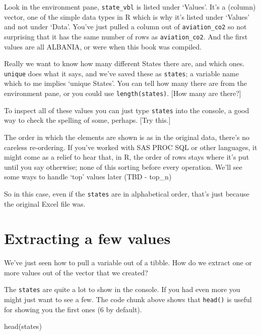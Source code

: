 \documentclass[
]{book}
\newenvironment{Shaded}{\begin{snugshade}}{\end{snugshade}}
\newcommand{\FunctionTok}[1]{\textcolor[rgb]{0.00,0.00,0.00}{#1}}
\newcommand{\NormalTok}[1]{#1}
\begin{document}
Look in the environment pane, \texttt{state\_vbl} is listed under `Values'. It's a (column) vector, one of the simple data types in R which is why it's listed under `Values' and not under `Data'. You've just pulled a column out of \texttt{aviation\_co2} so not surprising that it has the same number of rows as \texttt{aviation\_co2}. And the first values are all ALBANIA, or were when this book was compiled.

Really we want to know how many different States there are, and which ones. \texttt{unique} does what it says, and we've saved these as \texttt{states}; a variable name which to me implies `unique States'. You can tell how many there are from the environment pane, or you could use \texttt{length(states)}. {[}How many are there?{]}

To inspect all of these values you can just type \texttt{states} into the console, a good way to check the spelling of some, perhaps. {[}Try this.{]}

The order in which the elements are shown is as in the original data, there's no careless re-ordering. If you've worked with SAS PROC SQL or other languages, it might come as a relief to hear that, in R, the order of rows stays where it's put until you say otherwise; none of this sorting before every operation. We'll see some ways to handle `top' values later (TBD - top\_n)

So in this case, even if the \texttt{states} are in alphabetical order, that's just because the original Excel file was.

\hypertarget{extracting-a-few-values}{%
\section{Extracting a few values}\label{extracting-a-few-values}}

We've just seen how to pull a variable out of a tibble. How do we extract one or more values out of the vector that we created?

The \texttt{states} are quite a lot to show in the console. If you had even more you might just want to see a few. The code chunk above shows that \texttt{head()} is useful for showing you the first ones (6 by default).

\begin{Shaded}
\begin{Highlighting}[]
\FunctionTok{head}\NormalTok{(states)}
\end{Highlighting}
\end{Shaded}
\end{document}
